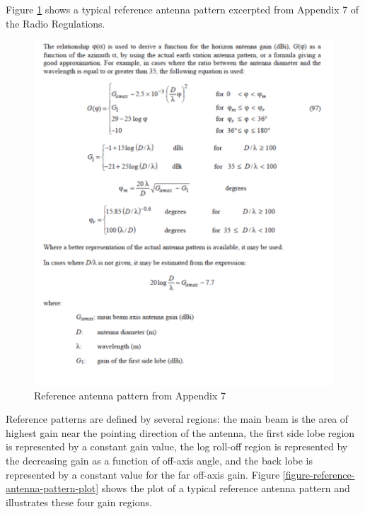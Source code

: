 \documentclass[11pt]{article}
\begin{document}
Figure \ref{figure-reference-antenna-pattern-equations} shows a
typical reference antenna pattern excerpted from Appendix 7 of the
Radio Regulations.
 
\begin{figure}
  \begin{center}
    \includegraphics[width=5.0in]{figure-reference-antenna-pattern-equations.pdf}
  \end{center}
  \caption{Reference antenna pattern from Appendix 7}\label{figure-reference-antenna-pattern-equations}
\end{figure}

Reference patterns are defined by several regions: the main beam is the
area of highest gain near the pointing direction of the antenna, the
first side lobe region is represented by a constant gain value, the log
roll-off region is represented by the decreasing gain as a function of
off-axis angle, and the back lobe is represented by a constant value
for the far off-axis gain.  Figure
\ref{figure-reference-antenna-pattern-plot} shows the plot of a
typical reference antenna pattern and illustrates these four gain
regions.
\end{document}
